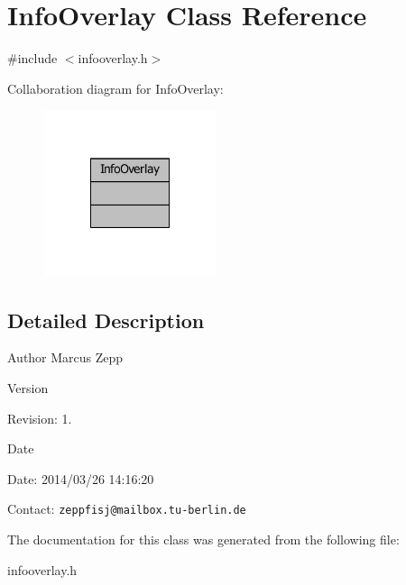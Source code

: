 \section{Info\-Overlay Class Reference}
\label{classInfoOverlay}


{\ttfamily \#include $<$infooverlay.\-h$>$}



Collaboration diagram for Info\-Overlay\-:\nopagebreak
\begin{figure}[H]
\begin{center}
\leavevmode
\includegraphics[width=144pt]{da/d7f/classInfoOverlay__coll__graph}
\end{center}
\end{figure}


\subsection{Detailed Description}
\begin{DoxyAuthor}{Author}
Marcus Zepp
\end{DoxyAuthor}
\begin{DoxyVersion}{Version}

\end{DoxyVersion}
\begin{DoxyParagraph}{Revision\-:}
1. 
\end{DoxyParagraph}


\begin{DoxyDate}{Date}

\end{DoxyDate}
\begin{DoxyParagraph}{Date\-:}
2014/03/26 14\-:16\-:20 
\end{DoxyParagraph}


Contact\-: {\tt zeppfisj@mailbox.\-tu-\/berlin.\-de} 

The documentation for this class was generated from the following file\-:\begin{DoxyCompactItemize}
\item 
infooverlay.\-h\end{DoxyCompactItemize}
